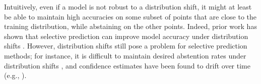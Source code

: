 Intuitively, even if a model is not robust to a distribution shift,
it might at least be able to maintain high accuracies on some subset of points that are close to the training distribution, while abstaining on the other points.
Indeed, prior work has shown that selective prediction can improve model accuracy under distribution shifts
\citep{pimentel2014review, hendrycks2017baseline, liang2018enhancing,
ovadia2019uncertainty, feng2019selective, kamath2020squads}.
However, distribution shifts still pose a problem for selective prediction methods;
for instance, it is difficult to maintain desired abstention rates under distribution shifts \citep{kompa2020empirical}, and confidence estimates have been found to drift over time (e.g.,  \citet{davis2017calibration}).
